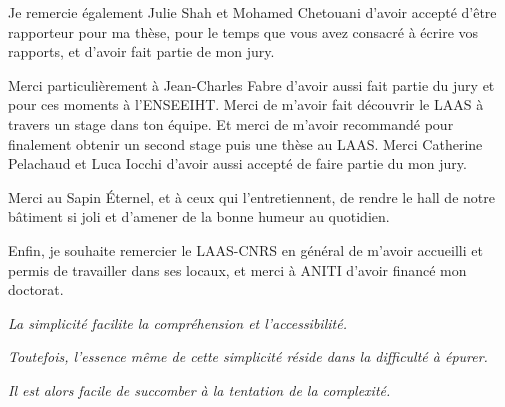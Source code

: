 
Je remercie également Julie Shah et Mohamed Chetouani d'avoir accepté d'être rapporteur pour ma thèse, pour le temps que vous avez consacré à écrire vos rapports, et d'avoir fait partie de mon jury. 

Merci particulièrement à Jean-Charles Fabre d'avoir aussi fait partie du jury et pour ces moments à l'ENSEEIHT. Merci de m'avoir fait découvrir le LAAS à travers un stage dans ton équipe. Et merci de m'avoir recommandé pour finalement obtenir un second stage puis une thèse au LAAS.
Merci Catherine Pelachaud et Luca Iocchi d'avoir aussi accepté de faire partie du mon jury. 



Merci au Sapin Éternel, et à ceux qui l'entretiennent, de rendre le hall de notre bâtiment si joli et d'amener de la bonne humeur au quotidien.



Enfin, je souhaite remercier le LAAS-CNRS en général de m'avoir accueilli et permis de travailler dans ses locaux, et merci à ANITI d'avoir financé mon doctorat.


\vfill




    



\begin{center}
    
    \textit{La simplicité facilite la compréhension et l'accessibilité.}
    
    \textit{Toutefois, l'essence même de cette simplicité réside dans la difficulté à épurer.}
    
    \textit{Il est alors facile de succomber à la tentation de la complexité.}
    
\end{center}

\vfill 